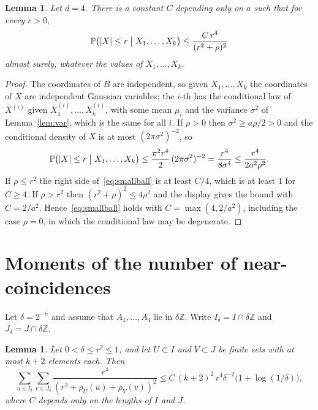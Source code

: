 \documentclass[11pt]{amsart}
\newtheorem{lemma}[theorem]{Lemma}
\theoremstyle{remark}
\newcommand{\Z}{\mathbb{Z}}
\newcommand{\PP}{\mathbb{P}}
\begin{document}
\begin{lemma}\label{lem:smallball}
Let $d=4$. There is a constant $C$ depending only on $a$ such that for every $r>0$,
\begin{equation}\label{eq:smallball}
\PP\bigl(|X|\le r\bigm| X_1,\dots,X_k\bigr)\le\frac{C\,r^4}{(r^2+\rho)^2}
\end{equation}
almost surely, whatever the values of $X_1,\dots,X_k$.
\end{lemma}

\begin{proof}
The coordinates of $B$ are independent, so given $X_1,\dots,X_k$ the coordinates of $X$ are independent Gaussian
variables; the $i$-th has the conditional law of $X^{(i)}$ given $X^{(i)}_1,\dots,X^{(i)}_k$, with some mean $\mu_i$
and the variance $\sigma^2$ of Lemma~\ref{lem:var}, which is the same for all $i$. If $\rho>0$ then $\sigma^2\ge
a\rho/2>0$ and the conditional density of $X$ is at most $(2\pi\sigma^2)^{-2}$, so
\[
\PP\bigl(|X|\le r\bigm| X_1,\dots,X_k\bigr)\le\frac{\pi^2r^4}{2}\,(2\pi\sigma^2)^{-2}=\frac{r^4}{8\sigma^4}\le
\frac{r^4}{2a^2\rho^2}.
\]
If $\rho\le r^2$ the right side of~\eqref{eq:smallball} is at least $C/4$, which is at least $1$ for $C\ge4$. If
$\rho>r^2$ then $(r^2+\rho)^2\le4\rho^2$ and the display gives the bound with $C=2/a^2$. Hence~\eqref{eq:smallball}
holds with $C=\max(4,2/a^2)$, including the case $\rho=0$, in which the conditional law may be degenerate.
\end{proof}

\section{Moments of the number of near-coincidences}\label{sec:moments}

Let $\delta=2^{-n}$ and assume that $A_1,\dots,A_4$ lie in $\delta\Z$. Write $I_\delta=I\cap\delta\Z$ and
$J_\delta=J\cap\delta\Z$.

\begin{lemma}\label{lem:lattice}
Let $0<\delta\le r^2\le1$, and let $U\subset I$ and $V\subset J$ be finite sets with at most $k+2$ elements each. Then
\begin{equation}\label{eq:lattice}
\sum_{u\in I_\delta}\sum_{v\in J_\delta}\frac{r^4}{(r^2+\rho_U(u)+\rho_V(v))^2}\le C\,(k+2)^2\,r^4\delta^{-2}
\bigl(1+\log(1/\delta)\bigr),
\end{equation}
where $C$ depends only on the lengths of $I$ and $J$.
\end{lemma}
\end{document}
